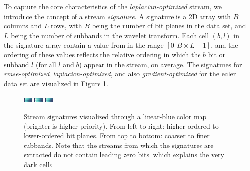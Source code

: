 To capture the core characteristics of the \emph{laplacian-optimized} stream, we introduce the
concept of a stream \emph{signature}. A signature is a 2D array with $B$ columns and $L$ rows, with
$B$ being the number of bit planes in the data set, and $L$ being the number of subbands in the
wavelet transform. Each cell $(b,l)$ in the signature array contain a value from in the range
$[0,B\times L-1]$, and the ordering of these values reflects the relative ordering in which the $b$
bit on subband $l$ (for all $l$ and $b$) appear in the stream, on average. The signatures for
\emph{rmse-optimized}, \emph{laplacian-optimized}, and also \emph{gradient-optimized} for the euler
data set are visualized in Figure \ref{fig:signature-comparison}. 

\begin{figure}
	\centering
	{\includegraphics[width=0.32\linewidth]{img/gradient-laplacian/SIG-GREEDY-(rmse).png}}
	{\includegraphics[width=0.32\linewidth]{img/gradient-laplacian/SIG-GREEDY-(laplacian).png}}
	{\includegraphics[width=0.32\linewidth]{img/gradient-laplacian/SIG-GREEDY-(gradient).png}}
	\caption{Stream signatures visualized through a linear-blue color map (brighter is higher
	priority). From left to right: higher-ordered to lower-ordered bit planes. From top to bottom:
	coarser to finer subbands. Note that the streams from which the signatures are extracted do not
	contain leading zero bits, which explains the very dark cells }
	\label{fig:signature-comparison}
\end{figure}

